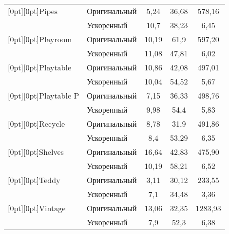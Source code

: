 \begin{table}
\begin{center}
\begin{tabular}{|l|l|c|c|c|}
\hline
\multicolumn{1}{|l|}{\raisebox{-6pt}[0pt][0pt]{Pipes}}&Оригинальный&
\hphantom{9}5,24&36,68&578,16\\
&Ускоренный&10,7\hphantom{9}&38,23&\hphantom{99}6,45\\
\hline
\multicolumn{1}{|l|}{\raisebox{-6pt}[0pt][0pt]{Playroom}}&Оригинальный&10,19&61,9\hphantom{9}&597,20\\
&Ускоренный&11,08&47,81&\hphantom{99}6,02\\
\hline
\multicolumn{1}{|l|}{\raisebox{-6pt}[0pt][0pt]{Playtable}}&Оригинальный&10,86&42,08&497,01\\
&Ускоренный&10,04&54,52&\hphantom{99}5,67\\
\hline
\multicolumn{1}{|l|}{\raisebox{-6pt}[0pt][0pt]{Playtable P}}&Оригинальный&
\hphantom{9}7,15&36,33&498,76\\
&Ускоренный&\hphantom{9}9,98&54,4\hphantom{9}&\hphantom{99}5,83\\
\hline
\multicolumn{1}{|l|}{\raisebox{-6pt}[0pt][0pt]{Recycle}}&Оригинальный&
\hphantom{9}8,78&31,9\hphantom{9}&491,86\\
&Ускоренный&8,4&53,29&\hphantom{99}6,35\\
\hline
\multicolumn{1}{|l|}{\raisebox{-6pt}[0pt][0pt]{Shelves}}&Оригинальный&16,64&42,83&475,90\\
&Ускоренный&10,19&58,21&\hphantom{99}6,52\\
\hline
\multicolumn{1}{|l|}{\raisebox{-6pt}[0pt][0pt]{Teddy}}&Оригинальный&
\hphantom{9}3,11&30,12&233,55\\
&Ускоренный&7,1&34,48&\hphantom{99}3,36\\
\hline
\multicolumn{1}{|l|}{\raisebox{-6pt}[0pt][0pt]{Vintage}}&Оригинальный&13,06&32,35&
1283,93\hphantom{9}\\
&Ускоренный&7,9&52,3\hphantom{9}&\hphantom{99}6,38\\
\hline
\end{tabular}
\end{center}
\end{table}

